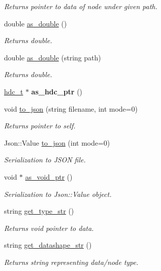 \begin{DoxyCompactItemize}
\begin{DoxyCompactList}\small\item\em Returns pointer to data of node under given path. \end{DoxyCompactList}\item 
double \hyperlink{a00003_a12e3492b3755543da2c6b1571629e23c}{as\+\_\+double} ()
\begin{DoxyCompactList}\small\item\em Returns double. \end{DoxyCompactList}\item 
double \hyperlink{a00003_a10b21a25e3429e9844084b74a8bacbaa}{as\+\_\+double} (string path)
\begin{DoxyCompactList}\small\item\em Returns double. \end{DoxyCompactList}\item 
\hyperlink{a00007}{hdc\+\_\+t} $\ast$ {\bfseries as\+\_\+hdc\+\_\+ptr} ()\hypertarget{a00003_aea48e6e093255899e87151031408d0eb}{}\label{a00003_aea48e6e093255899e87151031408d0eb}

\item 
void \hyperlink{a00003_af7684e94ec717ae6e9de1ba1f0e6bff0}{to\+\_\+json} (string filename, int mode=0)
\begin{DoxyCompactList}\small\item\em Returns pointer to self. \end{DoxyCompactList}\item 
Json\+::\+Value \hyperlink{a00003_a801f7f1bd6c145b0fef673b99b0724d2}{to\+\_\+json} (int mode=0)
\begin{DoxyCompactList}\small\item\em Serialization to J\+S\+ON file. \end{DoxyCompactList}\item 
void $\ast$ \hyperlink{a00003_ae3c66b7860c6394eb777770d0601fceb}{as\+\_\+void\+\_\+ptr} ()
\begin{DoxyCompactList}\small\item\em Serialization to Json\+::\+Value object. \end{DoxyCompactList}\item 
string \hyperlink{a00003_adb9061053ac1426deae825e364b340bc}{get\+\_\+type\+\_\+str} ()
\begin{DoxyCompactList}\small\item\em Returns void pointer to data. \end{DoxyCompactList}\item 
string \hyperlink{a00003_a57618e790b5eb42e4fb3f35fe95eed07}{get\+\_\+datashape\+\_\+str} ()
\begin{DoxyCompactList}\small\item\em Returns string representing data/node type. \end{DoxyCompactList}\end{DoxyCompactItemize}



